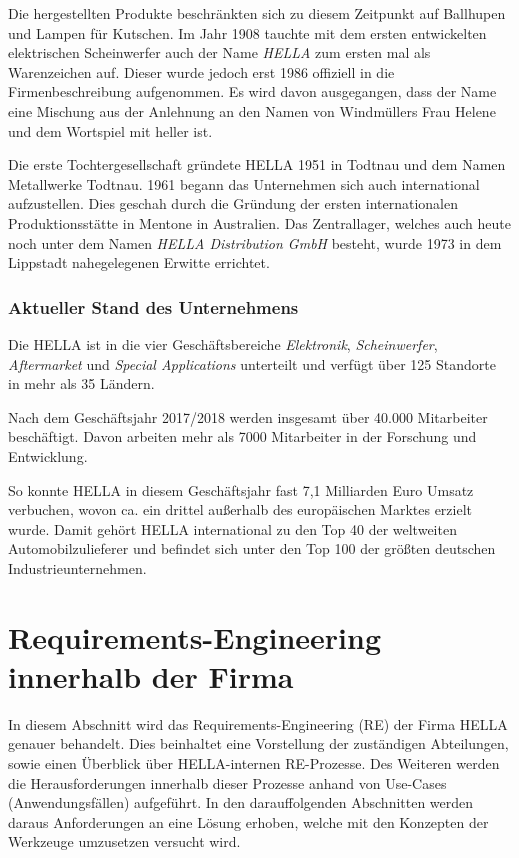 \documentclass[12pt]{report}
\begin{document}
Die hergestellten Produkte beschränkten sich zu diesem Zeitpunkt auf Ballhupen und Lampen für Kutschen. Im Jahr 1908 tauchte mit dem ersten entwickelten elektrischen Scheinwerfer auch der Name \textit{HELLA} zum ersten mal als Warenzeichen auf. Dieser wurde jedoch erst 1986 offiziell in die Firmenbeschreibung aufgenommen. Es wird davon ausgegangen, dass der Name eine Mischung aus der Anlehnung an den Namen von Windmüllers Frau Helene und dem Wortspiel mit \glqq heller\grqq{} ist. 

Die erste Tochtergesellschaft gründete HELLA 1951 in Todtnau und dem Namen \glqq Metallwerke Todtnau\grqq. 1961 begann das Unternehmen sich auch international aufzustellen. Dies geschah durch die Gründung der ersten internationalen Produktionsstätte in Mentone in Australien. 
Das Zentrallager, welches auch heute noch unter dem Namen \textit{HELLA Distribution GmbH} besteht, wurde 1973 in dem Lippstadt nahegelegenen Erwitte errichtet. 
\subsubsection[Aktueller Stand]{Aktueller Stand des Unternehmens}
Die HELLA ist in die vier Geschäftsbereiche \textit{Elektronik}, \textit{Scheinwerfer}, \textit{Aftermarket} und \textit{Special Applications} unterteilt und verfügt über 125 Standorte in mehr als 35 Ländern.

Nach dem Geschäftsjahr 2017/2018 werden insgesamt über 40.000 Mitarbeiter beschäftigt. Davon arbeiten mehr als 7000 Mitarbeiter in der Forschung und Entwicklung. 

So konnte HELLA in diesem Geschäftsjahr fast 7,1 Milliarden Euro Umsatz verbuchen, wovon ca. ein drittel außerhalb des europäischen Marktes erzielt wurde. Damit gehört HELLA international zu den Top 40 der weltweiten Automobilzulieferer und befindet sich unter den Top 100 der größten deutschen Industrieunternehmen. \cite{he19}

\section[RE bei HELLA]{Requirements-Engineering innerhalb der Firma}
In diesem Abschnitt wird das Requirements-Engineering (RE) der Firma HELLA genauer behandelt. Dies beinhaltet eine Vorstellung der zuständigen Abteilungen, sowie einen Überblick über HELLA-internen RE-Prozesse. Des Weiteren werden die Herausforderungen innerhalb dieser Prozesse anhand von Use-Cases (Anwendungsfällen) aufgeführt. In den darauffolgenden Abschnitten werden daraus Anforderungen an eine Lösung erhoben, welche mit den Konzepten der Werkzeuge umzusetzen versucht wird.
\end{document}
